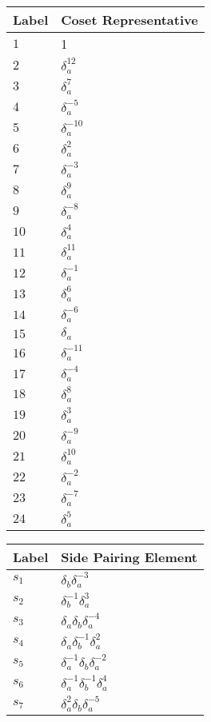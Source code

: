 \documentclass{article}
\begin{document}

\begin{center}
\begin{tabular}{ll}
\toprule
Label & Coset Representative\\
\midrule
$1$ & 1 \\
$2$ & $\delta_a^{12}$ \\
$3$ & $\delta_a^{7}$ \\
$4$ & $\delta_a^{-5}$ \\
$5$ & $\delta_a^{-10}$ \\
$6$ & $\delta_a^{2}$ \\
$7$ & $\delta_a^{-3}$ \\
$8$ & $\delta_a^{9}$ \\
$9$ & $\delta_a^{-8}$ \\
$10$ & $\delta_a^{4}$ \\
$11$ & $\delta_a^{11}$ \\
$12$ & $\delta_a^{-1}$ \\
$13$ & $\delta_a^{6}$ \\
$14$ & $\delta_a^{-6}$ \\
$15$ & $\delta_a^{}$ \\
$16$ & $\delta_a^{-11}$ \\
$17$ & $\delta_a^{-4}$ \\
$18$ & $\delta_a^{8}$ \\
$19$ & $\delta_a^{3}$ \\
$20$ & $\delta_a^{-9}$ \\
$21$ & $\delta_a^{10}$ \\
$22$ & $\delta_a^{-2}$ \\
$23$ & $\delta_a^{-7}$ \\
$24$ & $\delta_a^{5}$ \\
\bottomrule
\end{tabular}
\hfill
\begin{tabular}{ll}
\toprule
Label & Side Pairing Element\\
\midrule
$s_{1}$ & $\delta_b^{}\delta_a^{-3}$ \\
$s_{2}$ & $\delta_b^{-1}\delta_a^{3}$ \\
$s_{3}$ & $\delta_a^{}\delta_b^{}\delta_a^{-4}$ \\
$s_{4}$ & $\delta_a^{}\delta_b^{-1}\delta_a^{2}$ \\
$s_{5}$ & $\delta_a^{-1}\delta_b^{}\delta_a^{-2}$ \\
$s_{6}$ & $\delta_a^{-1}\delta_b^{-1}\delta_a^{4}$ \\
$s_{7}$ & $\delta_a^{2}\delta_b^{}\delta_a^{-5}$ \\

\end{tabular}
\end{center}
\end{document}
